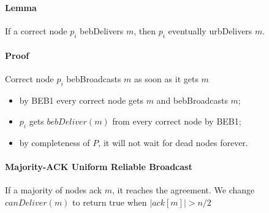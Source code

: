 \paragraph{Lemma} If a correct node $p_i$ bebDelivers $m$, then $p_i$ eventually
urbDelivers $m$.

\paragraph{Proof} Correct node $p_i$ bebBroadcasts $m$ as soon as it gets $m$

\begin{itemize}
    \item by BEB1 every correct node gets $m$ and bebBroadcasts $m$;
    \item $p_i$ gets $bebDeliver(m)$ from every correct node by BEB1;
    \item by completeness of $P$, it will not wait for dead nodes forever.
\end{itemize}

\paragraph{Majority-ACK Uniform Reliable Broadcast} If a majority of nodes
ack $m$, it reaches the agreement. We change $canDeliver(m)$ to return true when
$\mid ack[m] \mid > n/2$
